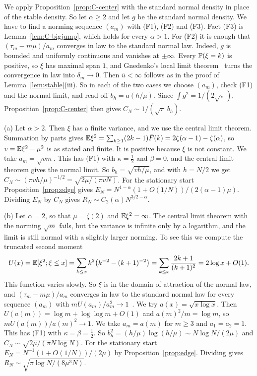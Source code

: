 We apply Proposition~\ref{prop:C-center} with the standard normal density in place of the
stable density. So let $\alpha\ge2$ and let $g$ be the standard normal density. We have
to find a norming sequence $(a_m)$ with (F1), (F2) and (F3). Fact (F3) is
Lemma~\ref{lem:C-bigjump}, which holds for every $\alpha>1$. For (F2) it is enough that
$(\tau_m-m\mu)/a_m$ converges in law to the standard normal law. Indeed, $g$ is bounded
and uniformly continuous and vanishes at $\pm\infty$. Every $\mathbb{P}(\xi=k)$ is positive,
so $\xi$ has maximal span $1$, and Gnedenko's local limit
theorem~\cite[Theorem~4.2.1]{ibragimovlinnik1971} turns the convergence in law into
$\delta_m\to0$. Then $\bar u<\infty$ follows as in the proof of
Lemma~\ref{lem:stable}(iii). So in each of the two cases we choose $(a_m)$, check (F1)
and the normal limit, and read off $b_h=a(h/\mu)$. Since $\int g^2=1/(2\sqrt\pi)$,
Proposition~\ref{prop:C-center} then gives $C_N\sim1/(\sqrt\pi\,b_h)$.

(a) Let $\alpha>2$. Then $\xi$ has a finite variance, and we use the central limit
theorem. Summation by parts gives
$\mathbb{E}\xi^2=\sum_{k\ge1}(2k-1)\bar F(k)=2\zeta(\alpha-1)-\zeta(\alpha)$, so $v=\mathbb{E}\xi^2-\mu^2$
is as stated and finite. It is positive because $\xi$ is not constant. We take
$a_m=\sqrt{vm}$. This has (F1) with $\kappa=\frac12$ and $\beta=0$, and the central limit
theorem gives the normal limit. So $b_h=\sqrt{vh/\mu}$, and with $h=N/2$ we get
$C_N\sim(\pi vh/\mu)^{-1/2}=\sqrt{2\mu/(\pi vN)}$. For the stationary start
Proposition~\ref{prop:edge} gives $E_N=N^{1-\alpha}(1+O(1/N))/(2(\alpha-1)\mu)$.
Dividing $E_N$ by $C_N$ gives $R_N\sim C_2(\alpha)N^{3/2-\alpha}$.

(b) Let $\alpha=2$, so that $\mu=\zeta(2)$ and $\mathbb{E}\xi^2=\infty$. The central limit
theorem with the norming $\sqrt m$ fails, but the variance is infinite only by a
logarithm, and the limit is still normal with a slightly larger norming. To see this we
compute the truncated second moment
\[
U(x)=\mathbb{E}[\xi^2;\xi\le x]=\sum_{k\le x}k^2\bigl(k^{-2}-(k+1)^{-2}\bigr)
=\sum_{k\le x}\frac{2k+1}{(k+1)^2}=2\log x+O(1).
\]
This function varies slowly. So $\xi$ is in the domain of attraction of the normal law,
and $(\tau_m-m\mu)/a_m$ converges in law to the standard normal law for every sequence
$(a_m)$ with
$mU(a_m)/a_m^2\to1$~\cite[Section~XVII.5]{feller1971}. We try
$a(x)=\sqrt{x\log x}$. Then $U(a(m))=\log m+\log\log m+O(1)$ and $a(m)^2/m=\log m$, so
$mU(a(m))/a(m)^2\to1$. We take $a_m=a(m)$ for $m\ge3$ and $a_1=a_2=1$. This has (F1)
with $\kappa=\beta=\frac12$. So $b_h^2=(h/\mu)\log(h/\mu)\sim N\log N/(2\mu)$ and
$C_N\sim\sqrt{2\mu/(\pi N\log N)}$. For the stationary start
$E_N=N^{-1}(1+O(1/N))/(2\mu)$ by Proposition~\ref{prop:edge}. Dividing gives
$R_N\sim\sqrt{\pi\log N/(8\mu^3N)}$.

